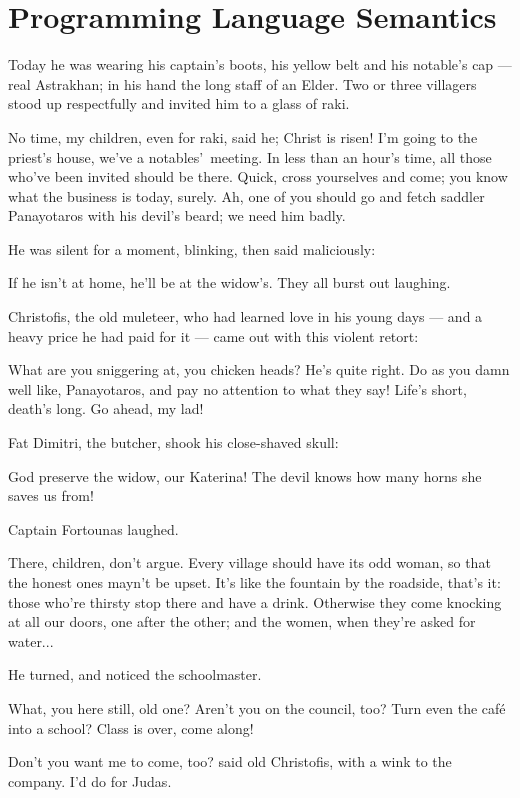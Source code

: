 \documentclass[diploma]{softlab-thesis}
\begin{document}
\section{Programming Language Semantics}

Today he was wearing his captain’s boots, his yellow belt and his notable’s
cap --- real Astrakhan; in his hand the long staff of an Elder. Two or three
villagers stood up respectfully and invited him to a glass of raki.

No time, my children, even for raki, said he; Christ is risen! I’m going to
the priest’s house, we’ve a notables’~meeting. In less than an hour’s time,
all those who’ve been invited should be there. Quick, cross yourselves and
come; you know what the business is today, surely. Ah, one of you should go
and fetch saddler Panayotaros with his devil’s beard; we need him badly.

He was silent for a moment, blinking, then said maliciously:

If he isn’t at home, he’ll be at the widow’s. They all burst out laughing.

Christofis, the old muleteer, who had learned love in his young days --- and
a heavy price he had paid for it --- came out with this violent retort:

What are you sniggering at, you chicken heads? He’s quite right. Do as you
damn well like, Panayotaros, and pay no attention to what they say! Life’s
short, death’s long. Go ahead, my lad!

Fat Dimitri, the butcher, shook his close-shaved skull:

God preserve the widow, our Katerina! The devil knows how many horns she
saves us from!

Captain Fortounas laughed.

There, children, don’t argue. Every village should have its odd woman, so
that the honest ones mayn’t be upset. It’s like the fountain by the
roadside, that’s it: those who’re thirsty stop there and have a
drink. Otherwise they come knocking at all our doors, one after the other;
and the women, when they’re asked for water...

He turned, and noticed the schoolmaster.

What, you here still, old one? Aren’t you on the council, too? Turn even the
café into a school? Class is over, come along!

Don’t you want me to come, too? said old Christofis, with a wink to the
company. I’d do for Judas.
\end{document}
